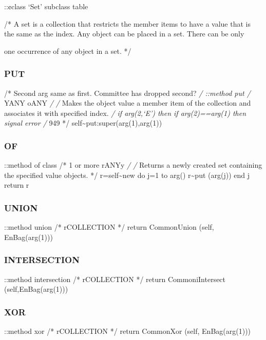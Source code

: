 ::¢class `Set' subclass table

/* A set is a collection that restricts the member items to have a value
that is the same as the index. Any object can be placed in a set. There
can be only

one occurrence of any object in a set. */

\hypertarget{put-2}{%
\subsubsection{PUT}\label{put-2}}

/* Second arg same as first. Committee has dropped second? \emph{/
::method put /} YANY oANY \emph{/ /} Makes the object value a member
item of the collection and associates it with specified index. \emph{/
if arg(2,`E') then if arg(2)==arg(1) then signal error /} 949 */
self\textasciitilde put:super(arg(1),arg(1))

\hypertarget{of-1}{%
\subsubsection{OF}\label{of-1}}

::method of class /* 1 or more rANYy \emph{/ /} Returns a newly created
set containing the specified value objects. */ r=self\textasciitilde new
do j=1 to arg() r\textasciitilde put (arg(j)) end j return r

\hypertarget{union-1}{%
\subsubsection{UNION}\label{union-1}}

::method union /* rCOLLECTION */ return CommonUnion (self,
EnBag(arg(1)))

\hypertarget{intersection-1}{%
\subsubsection{INTERSECTION}\label{intersection-1}}

::method intersection /* rCOLLECTION */ return CommoniIntersect
(self,EnBag(arg(1)))

\hypertarget{xor-1}{%
\subsubsection{XOR}\label{xor-1}}

::method xor /* rCOLLECTION */ return CommonXor (self, EnBag(arg(1)))

